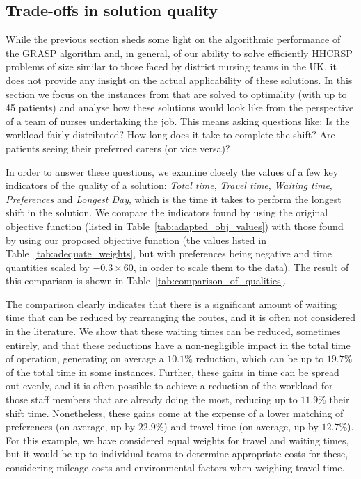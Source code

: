 \documentclass[a4paper,11pt]{elsarticle}
\begin{document}
\subsection{Trade-offs in solution quality}\label{seq:exploring_obj_function}
While the previous section sheds some light on the algorithmic performance of the GRASP algorithm and, in general, of our ability to solve efficiently HHCRSP problems of size similar to those faced by district nursing teams in the UK, it does not provide any insight on the actual applicability of these solutions.
In this section we focus on the instances from \cite{AitHaddadene2016} that are solved to optimality (with up to 45 patients) and analyse how these solutions would look like from the perspective of a team of nurses undertaking the job. This means asking questions like: Is the workload fairly distributed? How long does it take to complete the shift? Are patients seeing their preferred carers (or vice versa)?

In order to answer these questions, we examine closely the values of a few key indicators of the quality of a solution: \emph{Total time}, \emph{Travel time}, \emph{Waiting time}, \emph{Preferences} and \emph{Longest Day}, which is the time it takes to perform the longest shift in the solution. We compare the indicators found by using the original objective function (listed in Table~\ref{tab:adapted_obj_values}) with those found by using our proposed objective function (the values listed in Table~\ref{tab:adequate_weights}, but with preferences being negative and time quantities scaled by $-0.3\times60$, in order to scale them to the data). The result of this comparison is shown in Table~\ref{tab:comparison_of_qualities}.



The comparison clearly indicates that there is a significant amount of waiting time that can be reduced by rearranging the routes, and it is often not considered in the literature. We show that these waiting times can be reduced, sometimes entirely, and that these reductions have a non-negligible impact in the total time of operation, generating on average a $10.1\%$ reduction, which can be up to $19.7\%$ of the total time in some instances. Further, these gains in time can be spread out evenly, and it is often possible to achieve a reduction of the workload for those staff members that are already doing the most, reducing up to $11.9\%$ their shift time. Nonetheless, these gains come at the expense of a lower matching of preferences (on average, up by $22.9\%$) and travel time (on average, up by $12.7\%$). For this example, we have considered equal weights for travel and waiting times, but it would be up to individual teams to determine appropriate costs for these, considering mileage costs and environmental factors when weighing travel time.
\end{document}
